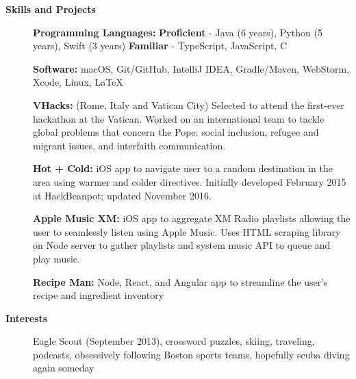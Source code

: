 \documentclass[letterpaper,10pt]{article}
\newcommand{\resheading}[1]{{\large \colorbox{mygrey}{\begin{minipage}{\textwidth}{\textbf{#1 \vphantom{p\^{E}}}}\end{minipage}}}}
\begin{document}
\resheading{Skills and Projects}
{\small
	\begin{description}
		\item[] \hspace{0.03in} \textbf{Programming Languages:} {\footnotesize \textbf{Proficient} - Java (6 years), Python (5 years), Swift (3 years) \enspace \textbf{Familiar} - TypeScript, JavaScript, C}
		\item[] \hspace{0.03in} \textbf{Software:} {\footnotesize macOS, Git/GitHub, IntelliJ IDEA, Gradle/Maven, WebStorm, Xcode, Linux, \LaTeX}
		\item[] \hspace{0.03in} \textbf{VHacks:} {\footnotesize (Rome, Italy and Vatican City) Selected to attend the first-ever hackathon at the Vatican. Worked on an international team to tackle global problems that concern the Pope: social inclusion, refugee and migrant issues, and interfaith communication.} 
		\item[] \hspace{0.03in} \textbf{Hot + Cold:} {\footnotesize iOS app to navigate user to a random destination in the area using warmer and colder directives. Initially developed February 2015 at HackBeanpot; updated November 2016.}
		\item[] \hspace{0.03in} \textbf{Apple Music XM:} {\footnotesize iOS app to aggregate XM Radio playlists allowing the user to seamlessly listen using Apple Music. Uses HTML scraping library on Node server to gather playlists and system music API to queue and play music.}
		\item[] \hspace{0.03in} \textbf{Recipe Man:} {\footnotesize Node, React, and Angular app to streamline the user's recipe and ingredient inventory}
\end{description}}

\resheading{Interests}
{\small
	\begin{description}
		\item[] \hspace{0.03in} Eagle Scout (September 2013), crossword puzzles, skiing, traveling, podcasts, obsessively following Boston sports teams, hopefully scuba diving again someday
	\end{description}}
\end{document}
